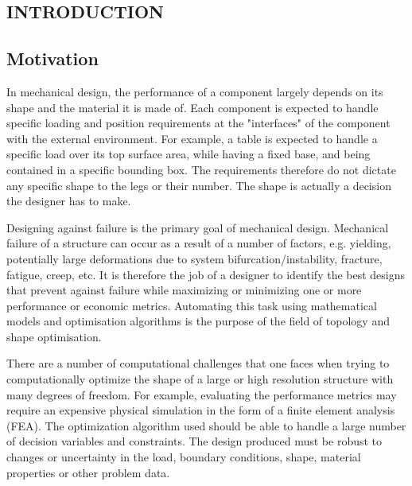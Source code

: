 
\begin{titlepage}\centering
\vspace*{\fill}

\chapter{INTRODUCTION}\thispagestyle{EmptyHeader}
\label{chp:1}

\vspace*{\fill}
\end{titlepage}


\section{Motivation}

In mechanical design, the performance of a component largely depends on its shape and the material it is made of. Each component is expected to handle specific loading and position requirements at the "interfaces" of the component with the external environment. For example, a table is expected to handle a specific load over its top surface area, while having a fixed base, and being contained in a specific bounding box. The requirements therefore do not dictate any specific shape to the legs or their number. The shape is actually a decision the designer has to make.

Designing against failure is the primary goal of mechanical design. Mechanical failure of a structure can occur as a result of a number of factors, e.g. yielding, potentially large deformations due to system bifurcation/instability, fracture, fatigue, creep, etc. It is therefore the job of a designer to identify the best designs that prevent against failure while maximizing or minimizing one or more performance or economic metrics. Automating this task using mathematical models and optimisation algorithms is the purpose of the field of topology and shape optimisation.

There are a number of computational challenges that one faces when trying to computationally optimize the shape of a large or high resolution structure with many degrees of freedom. For example, evaluating the performance metrics may require an expensive physical simulation in the form of a finite element analysis (FEA). The optimization algorithm used should be able to handle a large number of decision variables and constraints. The design produced must be robust to changes or uncertainty in the load, boundary conditions, shape, material properties or other problem data.

